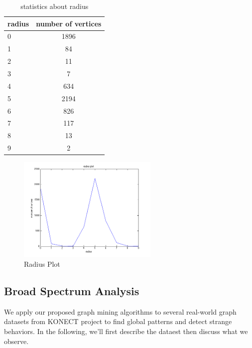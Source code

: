 \begin{table}
\begin{center}
\begin{tabular}{| l | c |}
  \hline                        
  radius & number of vertices  \\ \hline
  0 & 1896  \\ \hline
  1 & 84  \\ \hline
  2 & 11 \\ \hline
  3 & 7 \\ \hline  
  4 & 634 \\ \hline  
  5 & 2194 \\ \hline  
  6 & 826 \\ \hline  
  7 & 117 \\ \hline  
  8 & 13 \\ \hline
  9 & 2 \\ \hline   
\end{tabular}
\caption{statistics about radius}
\label{table:radius}
\end{center} 
\end{table}

\begin{figure}[htbf]
\begin{center}
     \includegraphics[width=0.6\textwidth]{FIG/radius.png}
\caption{Radius Plot}
\label{fig:radius}
\end{center}
\end{figure}

\subsection{Broad Spectrum Analysis}
We apply our proposed graph mining algorithms to several real-world graph datasets from KONECT project to find global patterns and detect strange behaviors. In the following, we'll first describe the dataest then discuss  what we observe. 

